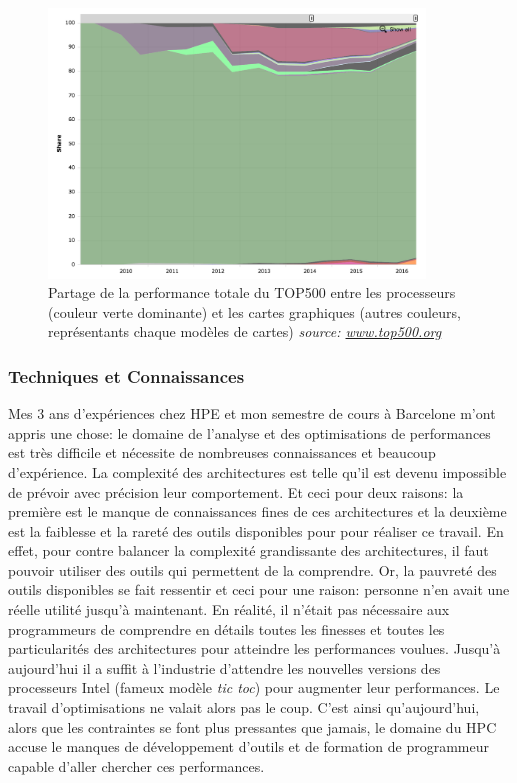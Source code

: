\begin{figure}
    \center
    \includegraphics[width=10cm]{images/Chapitre1/pic_GPU_repartition_TOP500.png}
    \caption{\label{pic_GPU_repartition_TOP500} Partage de la performance totale du TOP500 entre les processeurs (couleur verte dominante) et les cartes graphiques (autres couleurs, représentants chaque modèles de cartes) \textit{source: \url{www.top500.org}}  }
\end{figure}

\subsubsection{Techniques et Connaissances}


Mes 3 ans d'expériences chez HPE et mon semestre de cours à Barcelone m'ont appris une chose: le domaine de l'analyse et des optimisations de performances est très difficile et nécessite de nombreuses connaissances et beaucoup d'expérience. La complexité des  architectures est telle qu'il est devenu impossible de prévoir avec précision leur comportement. Et ceci pour deux raisons: la première est le manque de connaissances fines de ces architectures et la deuxième est la faiblesse et la rareté des outils disponibles pour pour réaliser ce travail. En effet, pour contre balancer la complexité grandissante des architectures, il faut pouvoir utiliser des outils qui permettent de la comprendre. Or, la pauvreté des outils disponibles se fait ressentir et ceci pour une raison: personne n'en avait une réelle utilité jusqu'à maintenant. En réalité, il n'était pas nécessaire aux programmeurs de comprendre en détails toutes les finesses et toutes les particularités des architectures pour atteindre les performances voulues. Jusqu'à aujourd'hui il a suffit à l'industrie d'attendre les nouvelles versions des processeurs Intel (fameux modèle \textit{tic toc}) pour augmenter leur performances. Le travail d'optimisations ne valait alors pas le coup. C'est ainsi qu'aujourd'hui, alors que les contraintes se font plus pressantes que jamais, le domaine du HPC accuse le manques de développement d'outils et de formation de programmeur capable d'aller chercher ces performances.

